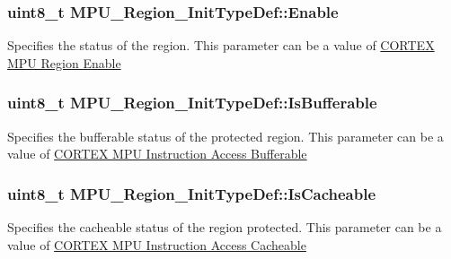 \subsubsection[{\texorpdfstring{Enable}{Enable}}]{\setlength{\rightskip}{0pt plus 5cm}uint8\+\_\+t M\+P\+U\+\_\+\+Region\+\_\+\+Init\+Type\+Def\+::\+Enable}\hypertarget{struct_m_p_u___region___init_type_def_a51f4cbbb7fd437e6b92435e30b003f53}{}\label{struct_m_p_u___region___init_type_def_a51f4cbbb7fd437e6b92435e30b003f53}
Specifies the status of the region. This parameter can be a value of \hyperlink{group___c_o_r_t_e_x___m_p_u___region___enable}{C\+O\+R\+T\+EX M\+PU Region Enable} 
\subsubsection[{\texorpdfstring{Is\+Bufferable}{IsBufferable}}]{\setlength{\rightskip}{0pt plus 5cm}uint8\+\_\+t M\+P\+U\+\_\+\+Region\+\_\+\+Init\+Type\+Def\+::\+Is\+Bufferable}\hypertarget{struct_m_p_u___region___init_type_def_aa5f126c8ba90f49f539d5f8d8ec223e0}{}\label{struct_m_p_u___region___init_type_def_aa5f126c8ba90f49f539d5f8d8ec223e0}
Specifies the bufferable status of the protected region. This parameter can be a value of \hyperlink{group___c_o_r_t_e_x___m_p_u___access___bufferable}{C\+O\+R\+T\+EX M\+PU Instruction Access Bufferable} 
\subsubsection[{\texorpdfstring{Is\+Cacheable}{IsCacheable}}]{\setlength{\rightskip}{0pt plus 5cm}uint8\+\_\+t M\+P\+U\+\_\+\+Region\+\_\+\+Init\+Type\+Def\+::\+Is\+Cacheable}\hypertarget{struct_m_p_u___region___init_type_def_afce4bf3777de9beda84f379956ee244d}{}\label{struct_m_p_u___region___init_type_def_afce4bf3777de9beda84f379956ee244d}
Specifies the cacheable status of the region protected. This parameter can be a value of \hyperlink{group___c_o_r_t_e_x___m_p_u___access___cacheable}{C\+O\+R\+T\+EX M\+PU Instruction Access Cacheable} 
